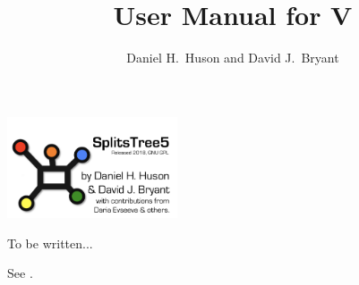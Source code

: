 \documentclass[11pt]{article}
\title{User Manual for \SplitsTree V\VERSION}
\author{Daniel H.~Huson and David J.~Bryant}
\begin{document}

\maketitle

\begin{center}
\includegraphics[height=3cm]{../../src/resources/images/Splitstree5-splash.png}
\end{center}

\tableofcontents

To be written...

See \cite{HusonBryant2006}.





\printindex
\end{document}
